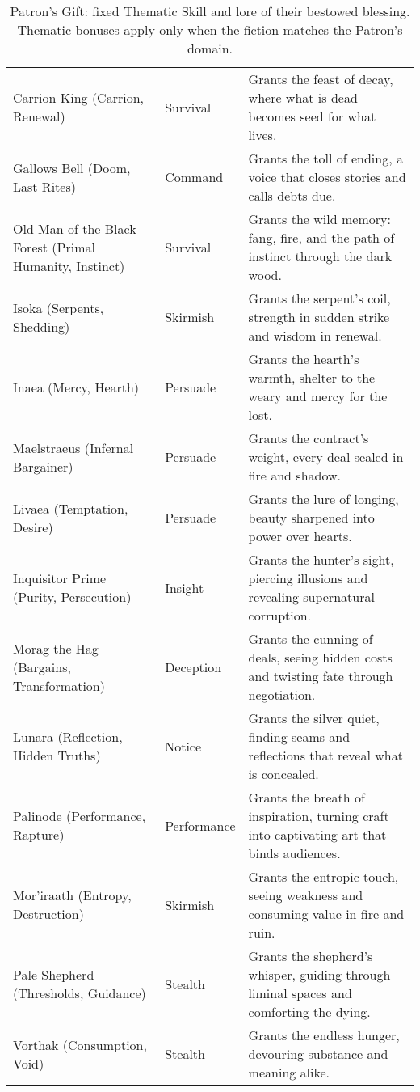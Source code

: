 \begin{table}[H]
\begin{tabular}{@{}p{3.8cm}p{3.8cm}p{7.5cm}@{}}
  Carrion King (Carrion, Renewal) & Survival & Grants the feast of decay, where what is dead becomes seed for what lives. \\
  Gallows Bell (Doom, Last Rites) & Command & Grants the toll of ending, a voice that closes stories and calls debts due. \\
  Old Man of the Black Forest (Primal Humanity, Instinct) & Survival & Grants the wild memory: fang, fire, and the path of instinct through the dark wood. \\
  Isoka (Serpents, Shedding) & Skirmish & Grants the serpent's coil, strength in sudden strike and wisdom in renewal. \\
  Inaea (Mercy, Hearth) & Persuade & Grants the hearth's warmth, shelter to the weary and mercy for the lost. \\
  Maelstraeus (Infernal Bargainer) & Persuade & Grants the contract's weight, every deal sealed in fire and shadow. \\
  Livaea (Temptation, Desire) & Persuade & Grants the lure of longing, beauty sharpened into power over hearts. \\
  Inquisitor Prime (Purity, Persecution) & Insight & Grants the hunter's sight, piercing illusions and revealing supernatural corruption. \\
  Morag the Hag (Bargains, Transformation) & Deception & Grants the cunning of deals, seeing hidden costs and twisting fate through negotiation. \\
  Lunara (Reflection, Hidden Truths) & Notice & Grants the silver quiet, finding seams and reflections that reveal what is concealed. \\
  Palinode (Performance, Rapture) & Performance & Grants the breath of inspiration, turning craft into captivating art that binds audiences. \\
  Mor'iraath (Entropy, Destruction) & Skirmish & Grants the entropic touch, seeing weakness and consuming value in fire and ruin. \\
  Pale Shepherd (Thresholds, Guidance) & Stealth & Grants the shepherd's whisper, guiding through liminal spaces and comforting the dying. \\
  Vorthak (Consumption, Void) & Stealth & Grants the endless hunger, devouring substance and meaning alike. \\
  \bottomrule
  \end{tabular}
  \caption{Patron's Gift: fixed Thematic Skill and lore of their bestowed blessing. Thematic bonuses apply only when the fiction matches the Patron's domain.}
  \label{tab:gift-thematic-map}
  \end{table}

